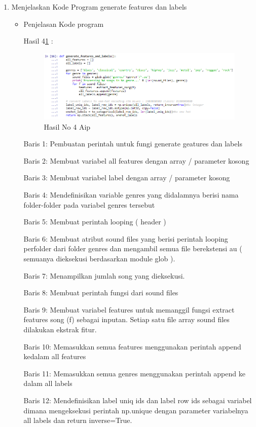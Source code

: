 \begin{enumerate}
\item Menjelaskan Kode Program generate features dan labels 
\begin{itemize}
\item Penjelasan Kode program

\par Hasil 4\ref{hasil4} :
\begin{figure}[!hbtp]
\centering
\includegraphics[scale=0.7]{figures/AIP/no4aip.PNG}
\caption{Hasil No 4 Aip}
\label{hasil4}
\end{figure}
\par Baris 1: Pembuatan perintah untuk fungi generate geatures dan labels
\par Baris 2: Membuat variabel all features dengan array / parameter kosong
\par Baris 3: Membuat variabel label dengan array / parameter kosong
\par Baris 4: Mendefinisikan variable genres yang didalamnya berisi nama folder-folder pada variabel genres tersebut
\par Baris 5: Membuat perintah looping ( header )
\par Baris 6: Membuat atribut sound files yang berisi perintah looping perfolder dari folder genres dan mengambil semua file berekstensi au ( semuanya dieksekusi berdasarkan module glob ).
\par Baris 7: Menampilkan jumlah song yang dieksekusi.
\par Baris 8: Membuat perintah fungsi dari sound files
\par Baris 9: Membuat variabel features untuk memanggil fungsi extract features song (f) sebagai inputan. Setiap satu file array sound files dilakukan ekstrak fitur.
\par Baris 10: Memasukkan semua features menggunakan perintah append kedalam all features
\par Baris 11: Memasukkan semua genres menggunakan perintah append ke dalam all labels
\par Baris 12: Mendefinisikan label uniq ids dan label row ids sebagai variabel dimana mengeksekusi perintah np.unique dengan parameter variabelnya all labels dan return inverse=True.

\end{itemize}
\end{enumerate}
